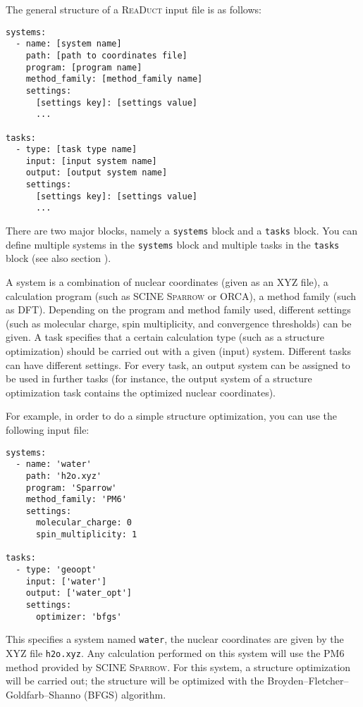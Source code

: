 \documentclass[]{tufte-book}
\begin{document}
The general structure of a \textsc{ReaDuct} input file is as follows:

\begin{verbatim}
systems:
  - name: [system name]
    path: [path to coordinates file]
    program: [program name]
    method_family: [method_family name]
    settings:
      [settings key]: [settings value]
      ...

tasks:
  - type: [task type name]
    input: [input system name]
    output: [output system name]
    settings:
      [settings key]: [settings value]
      ...

\end{verbatim}

There are two major blocks, namely a \texttt{systems} block and a \texttt{tasks} block. You can define multiple systems
in the \texttt{systems} block and multiple tasks in the \texttt{tasks} block (see also section ).

A system is a combination of nuclear coordinates (given as an XYZ file), a calculation program (such as SCINE \textsc{Sparrow}
or ORCA), a method family (such as DFT). Depending on the program and method family used,
different settings (such as molecular charge, spin multiplicity, and convergence thresholds) can be given.
A task specifies that a certain calculation type (such as a
structure optimization) should be carried out with a given (input) system. Different tasks can have different settings.
For every task, an output system can be assigned to be used in further tasks (for instance, the output system of a
structure optimization task contains the optimized nuclear coordinates).

For example, in order to do a simple structure optimization, you can use the following input file:

\begin{verbatim}
systems:
  - name: 'water'
    path: 'h2o.xyz'
    program: 'Sparrow'
    method_family: 'PM6'
    settings:
      molecular_charge: 0
      spin_multiplicity: 1

tasks:
  - type: 'geoopt'
    input: ['water']
    output: ['water_opt']
    settings:
      optimizer: 'bfgs'
\end{verbatim}

This specifies a system named \texttt{water}, the nuclear coordinates are given by the XYZ file \texttt{h2o.xyz}. Any
calculation performed on this system will use the PM6 method provided by SCINE \textsc{Sparrow}. For this system, a
structure optimization will be carried out; the structure will be optimized with the Broyden--Fletcher--Goldfarb--Shanno (BFGS) algorithm.
\end{document}
